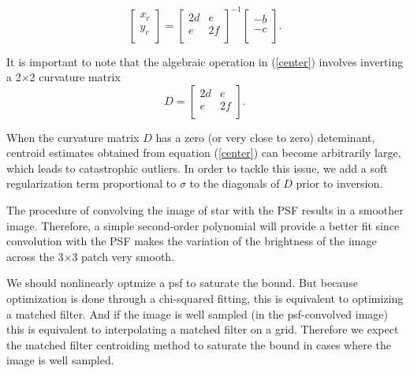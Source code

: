 \documentclass[12pt, preprint]{aastex}
\newcommand{\beq}{\begin{equation}}
\newcommand{\eeq}{\end{equation}}
\begin{document}
\begin{description}
\beq
  \begin{bmatrix}
      x_{c}\\
      y_{c}\\
  \end{bmatrix} = 
  \begin{bmatrix}
      2d & e\\
      e & 2f\\
  \end{bmatrix}^{-1}
  \begin{bmatrix}
      -b\\
      -c\\
  \end{bmatrix}.
\label{center}
\eeq

It is important to note that the algebraic operation in (\ref{center}) involves 
inverting a 2$\times$2 curvature matrix
\beq
  D = 
  \begin{bmatrix}
      2d & e\\
      e & 2f\\
  \end{bmatrix}.
\eeq

When the curvature matrix $D$ has a zero (or very close to zero) deteminant,
centroid estimates obtained from equation (\ref{center}) can become arbitrarily 
large, which leads to catastrophic outliers. 
In order to tackle this issue, we add a soft regularization term
proportional to $\sigma$ to the diagonals of $D$ prior to inversion.

The procedure of convolving the image of star with the PSF results in a
smoother image. Therefore, a simple second-order polynomial will provide a better fit 
since convolution with the PSF makes the variation of the brightness of the image 
across the 3$\times$3 patch very smooth.

We should nonlinearly optmize a psf to saturate the bound.
But because optimization is done through a chi-squared fitting, 
this is equivalent to optimizing a matched filter. 
And if the image is well sampled (in the psf-convolved image) this
is equivalent to interpolating a matched filter on a grid. 
Therefore we expect the matched filter centroiding method to 
saturate the bound in cases where the image is well sampled.
 

\end{description}
\end{document}
